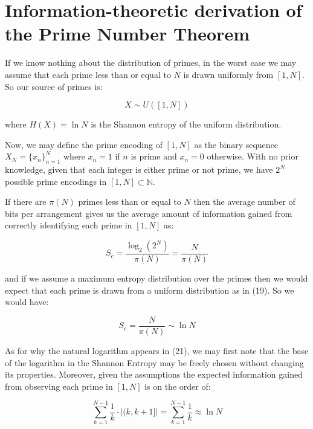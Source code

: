 \documentclass{article}
\begin{document}
\newpage 

\section{Information-theoretic derivation of the Prime Number Theorem}

If we know nothing about the distribution of primes, in the worst case we 
may assume that each prime less than or equal to $N$ is drawn uniformly from $[1,N]$. So our source of primes is: 

\begin{equation}
X \sim U([1,N])	
\end{equation}

where $H(X) = \ln N$ is the Shannon entropy of the uniform distribution. 

Now, we may define the prime encoding of $[1,N]$ as the binary sequence $X_N = \{x_n\}_{n=1}^N$ where $x_n = 1$ if $n$ is prime and $x_n = 0$ otherwise. With no prior knowledge, given that each integer is either prime or not prime, we have $2^N$ possible prime encodings in $[1,N] \subset \mathbb{N}$. 

If there are $\pi(N)$ primes less than or equal to $N$ then the average number of bits per arrangement gives us the average amount of information gained from correctly identifying each prime in $[1,N]$ as: 

\begin{equation}
S_c = \frac{\log_2 (2^N)}{\pi(N)} = \frac{N}{\pi(N)}	
\end{equation}

and if we assume a maximum entropy distribution over the primes then we would expect that each prime is drawn from a uniform distribution as in (19). So we would have: 

\begin{equation}
S_c = \frac{N}{\pi(N)} \sim \ln N	
\end{equation}

As for why the natural logarithm appears in (21), we may first note that the base of the logarithm in the Shannon Entropy may be freely chosen without changing its properties. Moreover, given the assumptions the expected information gained from observing each prime in $[1,N]$ is on the order of: 

\begin{equation}
\sum_{k=1}^{N-1} \frac{1}{k} \cdot |(k,k+1]| = \sum_{k=1}^{N-1} \frac{1}{k} \approx \ln N
\end{equation}
\end{document}
